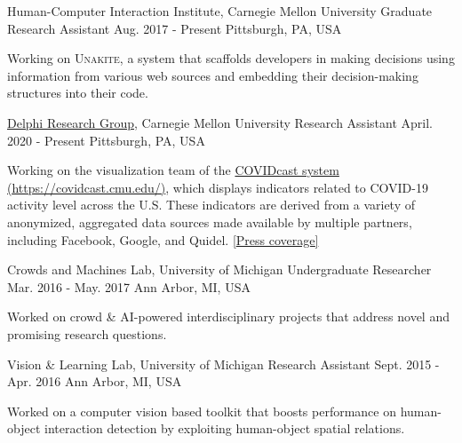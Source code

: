 \begin{cventries}
\cventry
  {Human-Computer Interaction Institute, Carnegie Mellon University} %
  {Graduate Research Assistant } %
  {Aug. 2017 - Present} %
  {Pittsburgh, PA, USA} %
  {
    \begin{cvitems} %
      \item {Working on \textsc{Unakite}, a system that scaffolds developers in making decisions using information from various web sources and embedding their decision-making structures into their code.}
    \end{cvitems}
  }

\cventry
  {
    \href{https://delphi.cmu.edu/}{Delphi Research Group}, Carnegie Mellon University} %
  {Research Assistant } %
  {April. 2020 - Present} %
  {Pittsburgh, PA, USA} %
  {
    \begin{cvitems} %
      \item {Working on the visualization team of the \href{https://covidcast.cmu.edu/}{COVIDcast system (\underline{https://covidcast.cmu.edu/})}, which displays indicators related to COVID-19 activity level across the U.S. These indicators are derived from a variety of anonymized, aggregated data sources made available by multiple partners, including Facebook, Google, and Quidel. \href{https://www.cmu.edu/news/stories/archives/2020/april/cmu-unveils-covidcast-maps.html}{[\underline{Press coverage}]}}
    \end{cvitems}
  }

\cventry
  {Crowds and Machines Lab, University of Michigan} %
  {Undergraduate Researcher } %
  {Mar. 2016 - May. 2017} %
  {Ann Arbor, MI, USA} %
  {
    \begin{cvitems} %
      \item {Worked on crowd \& AI-powered interdisciplinary projects that address novel and promising research questions.}
    \end{cvitems}
  }

\cventry
  {Vision \& Learning Lab, University of Michigan} %
  {Research Assistant } %
  {Sept. 2015 - Apr. 2016} %
  {Ann Arbor, MI, USA} %
  {
    \begin{cvitems} %
      \item {Worked on a computer vision based toolkit that boosts performance on human-object interaction detection by exploiting human-object spatial relations.}
    \end{cvitems}
  }
\end{cventries}
